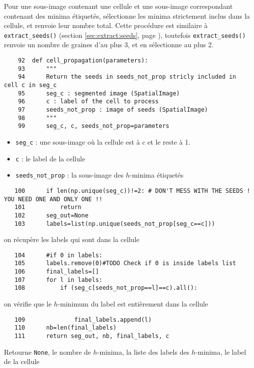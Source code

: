 \documentclass{article}
\def \mycolor {red}
\begin{document}
Pour une sous-image contenant une cellule et une sous-image correspondant contenant des minima \'etiquet\'es, s\'electionne les minima strictement inclus dans la cellule, et renvoie leur nombre total. Cette proc\'edure est similaire \`a \texttt{extract\_seeds()} (section \ref{sec:extract:seeds}, page \pageref{sec:extract:seeds}), toutefois \texttt{extract\_seeds()} renvoie un nombre de graines d'au plus 3, et en s\'electionne au plus 2.
\color{black}

\begin{verbatim}
    92	def cell_propagation(parameters):
    93	    """
    94	    Return the seeds in seeds_not_prop stricly included in cell c in seg_c
    95	    seg_c : segmented image (SpatialImage)
    96	    c : label of the cell to process
    97	    seeds_not_prop : image of seeds (SpatialImage)
    98	    """
    99	    seg_c, c, seeds_not_prop=parameters
\end{verbatim} 
\color{\mycolor}
\begin{itemize}
\itemsep -0.5ex
\item \verb|seg_c| : une sous-image o\`u la cellule est \`a $c$ et le reste \`a 1.
\item \verb|c| : le label de la cellule
\item \verb|seeds_not_prop| : la sous-image des $h$-minima \'etiquet\'es
\end{itemize}
\color{black}
\begin{verbatim}
   100	    if len(np.unique(seg_c))!=2: # DON'T MESS WITH THE SEEDS ! YOU NEED ONE AND ONLY ONE !!
   101	        return
   102	    seg_out=None
   103	    labels=list(np.unique(seeds_not_prop[seg_c==c]))
\end{verbatim} 
\color{\mycolor}
on r\'ecup\`ere les labels qui sont dans la cellule
\color{black}
\begin{verbatim}
   104	    #if 0 in labels:
   105	    labels.remove(0)#TODO Check if 0 is inside labels list 
   106	    final_labels=[]
   107	    for l in labels:
   108	        if (seg_c[seeds_not_prop==l]==c).all():
\end{verbatim} 
\color{\mycolor}
on v\'erifie que le $h$-minimum du label est enti\`erement dans la cellule 
\color{black}
\begin{verbatim}   
   109	            final_labels.append(l)
   110	    nb=len(final_labels)
   111	    return seg_out, nb, final_labels, c
\end{verbatim}
\color{\mycolor}
Retourne \texttt{None}, le nombre de $h$-minima, la liste des labels des $h$-minima, le label de la cellule
\color{black}
\end{document}

